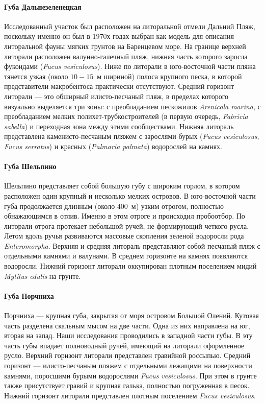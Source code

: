     \paragraph{Губа Дальнезеленецкая}
Исследованный   участок   был   расположен   на   литоральной   отмели   Дальний   Пляж, поскольку именно он был в 1970х годах выбран как модель для описания литоральной фауны мягких   грунтов   на   Баренцевом   море.   
На   границе   верхней   литорали   расположен   валунно-галечный   пляж,  нижняя   часть которого заросла фукоидами ({\it Fucus vesiculosus}). 
Ниже по литорали в юго-восточной части пляжа   тянется   узкая   (около   $10-15$~м   шириной)   полоса   крупного   песка,   в   которой представители макробентоса практически отсутствуют.
Средний   горизонт   литорали --- это   обширный   илисто-песчаный   пляж,   в  пределах которого визуально выделяется три зоны: с преобладанием пескожилов  {\it Arenicola marina}, с преобладанием   мелких   полихет-трубкостроителей   (в   первую   очередь, {\it Fabricia   sabella})   и переходная   зона   между   этими   сообществами.   
Нижняя   литораль   представлена   каменисто-песчаным пляжем с зарослями бурых ({\it Fucus vesiculosus}, {\it Fucus serratus}) и красных ({\it Palmaria  palmata}) водорослей на камнях.

    \paragraph{Губа Шельпино}
Шельпино   представляет   собой   большую   губу   с   широким   горлом,   в   котором расположен   один   крупный   и   несколько   мелких   островов.   
В   юго-восточной   части   губа продолжается   длинным   (около   $400$~м)   узким   отрогом,   полностью   обнажающимся   в   отлив. 
Именно в этом отроге и происходил пробоотбор. 
По   литорали   отрога   протекает   небольшой   ручей,   не   формирующий   четкого   русла. 
Летом вдоль ручья развиваются массовые скопления зеленой водоросли рода  {\it Enteromorpha}. 
Верхняя и средняя литораль представляют собой песчаный пляж с отдельными камнями и валунами. 
В среднем горизонте на камнях появляются водоросли. 
Нижний горизонт литорали оккупирован плотным поселением мидий {\it Mytilus edulis} на грунте.

    \paragraph{Губа Порчниха}
Порчниха  ---  крупная   губа,   закрытая   от   моря   островом   Большой   Олений.   
Кутовая часть разделена скальным мысом на две части. 
Одна из них направлена на юг, вторая на запад. 
Наши   исследования   проводились   в   западной   части   губы.   
В   эту   часть   губы   впадает полноводный ручей, имеющий на литорали оформленное русло. 
Верхний горизонт литорали представлен   гравийной   россыпью.   
Средний   горизонт   ---   илисто-песчаным   пляжем   с отдельными   лежащими   на   поверхности   камнями,   поросшими   бурыми   водорослями  {\it Fucus vesiculosus}.   
При   этом   в   грунте   также   присутствует   гравий   и   крупная   галька,   полностью погруженная в песок. 
Нижний горизонт литорали представлен плотным поселением   {\it Fucus  vesiculosus}.

